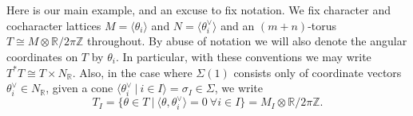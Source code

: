 \documentclass[11pt]{amsart}
\theoremstyle{definition}
\theoremstyle{remark}
\numberwithin{equation}{section}
\begin{document}


Here is our main example, and an excuse to fix notation. We fix character and cocharacter lattices $M = \langle \theta_i\rangle$ and $N = \langle \theta_i^\vee\rangle$ and an $(m+n)$-torus $T \cong M \otimes \mathbb{R}/2\pi\mathbb{Z}$ throughout. By abuse of notation we will also denote the angular coordinates on $T$ by $\theta_i$. In particular, with these conventions we may write $T^* T \cong T \times N_\mathbb{R}.$ Also, in the case where $\Sigma(1)$ consists only of coordinate vectors $\theta_i^\vee \in N_\mathbb{R}$, given a cone $\langle \theta_i^\vee \:|\: i \in I\rangle = \sigma_I \in \Sigma$, we write $$T_I = \{\theta \in T\:|\: \langle \theta, \theta_i^\vee\rangle = 0 \:\forall i \in I\} = M_I \otimes \mathbb{R}/2\pi\mathbb{Z}.$$
\end{document}
